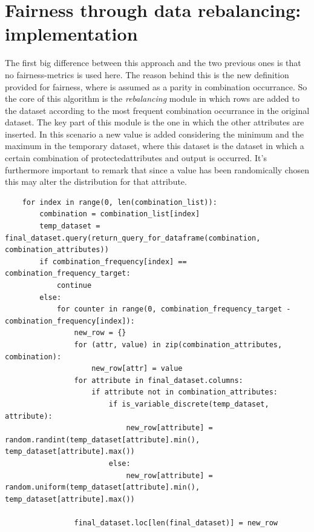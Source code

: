 \documentclass[12pt,a4paper,openright,twoside]{book}
\begin{document}
\section{Fairness through data rebalancing: implementation}
The first big difference between this approach and the two previous ones is that no fairness-metrics is used here. The reason behind this is the new definition provided for fairness, where is assumed as a parity in combination occurrance. So the core of this algorithm is the \emph{rebalancing} module in which rows are added to the dataset according to the most frequent combination occurrance in the original dataset.
The key part of this module is the one in which the other attributes are inserted. In this scenario a new value is added considering the minimum and the maximum in the temporary dataset, where this dataset is the dataset in which a certain combination of protected\textunderscore attributes and output is occurred. It's furthermore important to remark that since a value has been  randomically chosen this may alter the distribution for that attribute.
\begin{lstlisting}
    for index in range(0, len(combination_list)):
        combination = combination_list[index]
        temp_dataset = final_dataset.query(return_query_for_dataframe(combination, combination_attributes))
        if combination_frequency[index] == combination_frequency_target:
            continue
        else:
            for counter in range(0, combination_frequency_target - combination_frequency[index]):
                new_row = {}
                for (attr, value) in zip(combination_attributes, combination):
                    new_row[attr] = value
                for attribute in final_dataset.columns:
                    if attribute not in combination_attributes:
                        if is_variable_discrete(temp_dataset, attribute):
                            new_row[attribute] = random.randint(temp_dataset[attribute].min(), temp_dataset[attribute].max())
                        else:
                            new_row[attribute] = random.uniform(temp_dataset[attribute].min(), temp_dataset[attribute].max())
                
                final_dataset.loc[len(final_dataset)] = new_row

\end{lstlisting}

\end{document}
